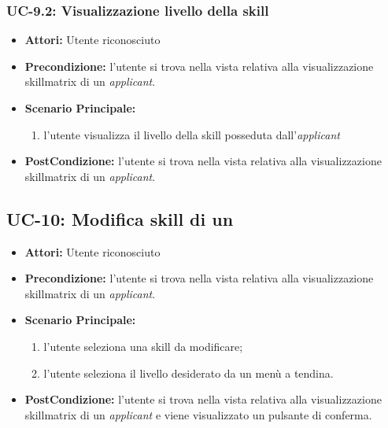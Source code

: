 \subsubsection{UC-9.2: Visualizzazione livello della skill}
\begin{itemize}
	\item \textbf{Attori:} Utente riconosciuto
	\item \textbf{Precondizione:}  l'utente si trova nella vista relativa alla visualizzazione skillmatrix di un \textit{applicant}.
	\item \textbf{Scenario Principale:}
	\begin{enumerate}
		\item l'utente visualizza il livello della skill posseduta dall'\textit{applicant}
	\end{enumerate}
	\item \textbf{PostCondizione:}  l'utente si trova nella vista relativa alla visualizzazione skillmatrix di un \textit{applicant}.
\end{itemize}



\subsection{UC-10: Modifica skill di un \applicant}
\begin{itemize}
\item \textbf{Attori:} Utente riconosciuto
\item \textbf{Precondizione:} l'utente si trova nella vista relativa alla visualizzazione skillmatrix di un \textit{applicant}.
\item \textbf{Scenario Principale:}
\begin{enumerate}
	\item l'utente seleziona una skill da modificare;
	\item l'utente seleziona il livello desiderato da un menù a tendina.
\end{enumerate}
\item \textbf{PostCondizione:} l'utente si trova nella vista relativa alla visualizzazione skillmatrix di un \textit{applicant} e viene visualizzato un pulsante di conferma.
\end{itemize}

